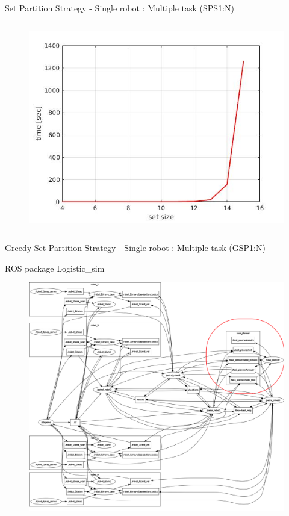 \begin{frame}[fragile]{Set Partition Strategy - Single robot : Multiple task (SPS1:N)}
\begin{columns}
\begin{column}{.4\textwidth}
\begin{figure}
                \includegraphics[width=\textwidth]{img/exp}
            \end{figure}
            \end{column}
        \end{columns}
    \end{frame}

    \begin{frame}[fragile]{Greedy Set Partition Strategy - Single robot : Multiple task (GSP1:N)}
    \end{frame}

    \begin{frame}[fragile]{ROS package Logistic\_sim}
        \begin{figure}[hbt]
            \centering
            \includegraphics[scale=0.12]{img/rosgraph}
        \end{figure}
    \end{frame}

